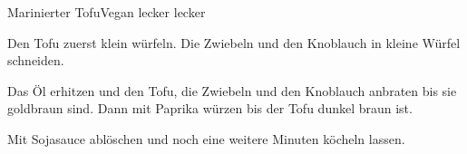 
\begin{recipe}[]{Marinierter Tofu}{Vegan lecker lecker}{}



\step
Den Tofu zuerst klein w\"urfeln. Die Zwiebeln und den Knoblauch in kleine W\"urfel schneiden.

\step
Das \"Ol erhitzen und den Tofu, die Zwiebeln und den Knoblauch anbraten bis sie goldbraun sind. Dann mit Paprika w\"urzen bis der Tofu dunkel braun ist.

\step
Mit Sojasauce abl\"oschen und noch eine weitere Minuten k\"ocheln lassen.


\end{recipe}
